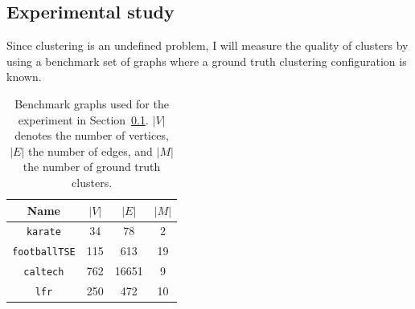 \subsection{Experimental study}
\label{sec:clustering_experiment}
Since clustering is an undefined problem, I will measure the quality of clusters by using a benchmark set of graphs where a ground truth clustering configuration is known.

\begin{table}
  \centering
  \caption[Benchmark graphs used for the experiment in Section~\ref{sec:clustering_experiment}]{Benchmark graphs used for the experiment in Section~\ref{sec:clustering_experiment}. $|V|$ denotes the number of vertices, $|E|$ the number of edges, and $|M|$ the number of ground truth clusters.}
  \setlength{\tabcolsep}{1em} %
  {\renewcommand{\arraystretch}{1.25}%
  \begin{tabular}{|c|c|c|c|}
    \hline
    Name & $|V|$ & $|E|$ & $|M|$
    \\\hline\hline
    \texttt{karate} & 34 & 78 & 2
    \\\hline
    \texttt{footballTSE} & 115 & 613 & 19
    \\\hline
    \texttt{caltech} & 762 & 16651 & 9
    \\\hline
    \texttt{lfr} & 250 & 472 & 10
    \\\hline
  \end{tabular}}
  \label{tab:bundle_graphs}
\end{table}

